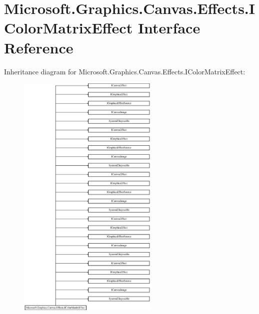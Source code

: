 \hypertarget{interface_microsoft_1_1_graphics_1_1_canvas_1_1_effects_1_1_i_color_matrix_effect}{}\section{Microsoft.\+Graphics.\+Canvas.\+Effects.\+I\+Color\+Matrix\+Effect Interface Reference}
\label{interface_microsoft_1_1_graphics_1_1_canvas_1_1_effects_1_1_i_color_matrix_effect}
Inheritance diagram for Microsoft.\+Graphics.\+Canvas.\+Effects.\+I\+Color\+Matrix\+Effect\+:\begin{figure}[H]
\begin{center}
\leavevmode
\includegraphics[height=12.000000cm]{interface_microsoft_1_1_graphics_1_1_canvas_1_1_effects_1_1_i_color_matrix_effect}
\end{center}
\end{figure}
